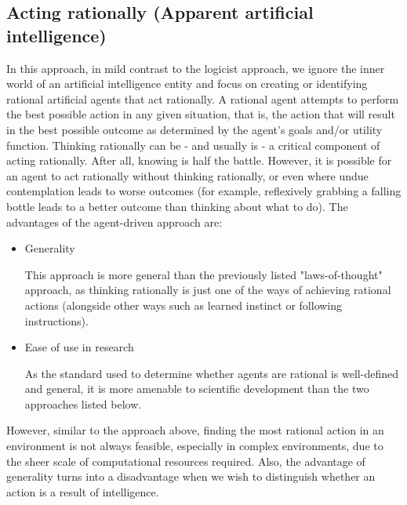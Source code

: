 \documentclass[masterthesis]{fer}
\begin{document}
\subsection{Acting rationally (Apparent artificial intelligence)}
In this approach, in mild contrast to the logicist approach, we ignore the inner world of an artificial intelligence entity and focus on creating or identifying rational artificial agents that act rationally.
A rational agent attempts to perform the best possible action in any given situation, that is, the action that will result in the best possible outcome as determined by the agent's goals and/or utility function.
Thinking rationally can be - and usually is - a critical component of acting rationally. After all, knowing is half the battle.
However, it is possible for an agent to act rationally without thinking rationally, or even where undue contemplation leads to worse outcomes (for example, reflexively grabbing a falling bottle leads to a better outcome than thinking about what to do).
The advantages of the agent-driven approach are:
\begin{itemize}
\item{Generality}

This approach is more general than the previously listed "laws-of-thought" approach, as thinking rationally is just one of the ways of achieving rational actions (alongside other ways such as learned instinct or following instructions).
\item{Ease of use in research}

As the standard used to determine whether agents are rational is well-defined and general, it is more amenable to scientific development than the two approaches listed below.
\end{itemize}
However, similar to the approach above, finding the most rational action in an environment is not always feasible, especially in complex environments, due to the sheer scale of computational resources required.
Also, the advantage of generality turns into a disadvantage when we wish to distinguish whether an action is a result of intelligence.
\end{document}
